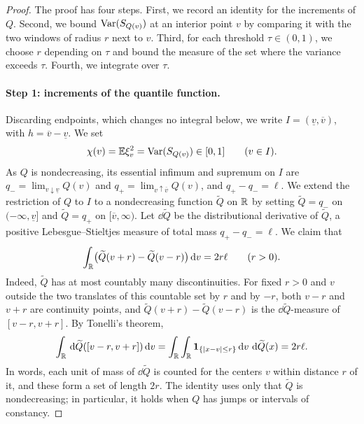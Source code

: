 \begin{proof}
The proof has four steps. First, we record an identity for the
increments of $Q$. Second, we bound $\operatorname{Var}(S_{Q(v)})$ at an interior
point $v$ by comparing it with the two windows of radius $r$ next to
$v$. Third, for each threshold $\tau\in(0,1)$, we choose $r$ depending
on $\tau$ and bound the measure of the set where the variance exceeds
$\tau$. Fourth, we integrate over $\tau$.

\paragraph{Step 1: increments of the quantile function.}
Discarding endpoints, which changes no integral below, we write
$I=(\underline v,\overline v)$, with $h=\overline v-\underline v$. We set
\[
 \chi(v)=\mathbb E\xi_v^2=\operatorname{Var}(S_{Q(v)})\in[0,1]\qquad(v\in I).
\]
As $Q$ is nondecreasing, its essential infimum and supremum on $I$ are
$q_-=\lim_{v\downarrow\underline v}Q(v)$ and
$q_+=\lim_{v\uparrow\overline v}Q(v)$, and $q_+-q_-=\ell$. We extend
the restriction of $Q$ to $I$ to a nondecreasing function $\widetilde Q$
on $\mathbb R$ by setting $\widetilde Q=q_-$ on $(-\infty,\underline v]$ and
$\widetilde Q=q_+$ on $[\overline v,\infty)$. Let $\dd\widetilde Q$ be
the distributional derivative of $\widetilde Q$, a positive
Lebesgue--Stieltjes measure of total mass $q_+-q_-=\ell$. We claim that
\begin{equation}\label{eq:wi-variation}
 \int_{\mathbb R}\bigl(\widetilde Q(v+r)-\widetilde Q(v-r)\bigr)\,\mathrm d v
 =2r\ell\qquad(r>0).
\end{equation}
Indeed, $\widetilde Q$ has at most countably many discontinuities. For
fixed $r>0$ and $v$ outside the two translates of this countable set by
$r$ and by $-r$, both $v-r$ and $v+r$ are continuity points, and
$\widetilde Q(v+r)-\widetilde Q(v-r)$ is the $\dd\widetilde Q$-measure of
$[v-r,v+r]$. By Tonelli's theorem,
\[
 \int_\mathbb R\,\mathrm d\widetilde Q([v-r,v+r])\,\mathrm d v
 =\int_\mathbb R\int_\mathbb R\mathbf1_{\{|x-v|\le r\}}\,\mathrm d v\,\,\mathrm d\widetilde Q(x)
 =2r\ell .
\]
In words, each unit of mass of $\dd\widetilde Q$ is counted for the
centers $v$ within distance $r$ of it, and these form a set of length
$2r$. The identity uses only that $\widetilde Q$ is nondecreasing; in
particular, it holds when $Q$ has jumps or intervals of constancy.


\end{proof}
